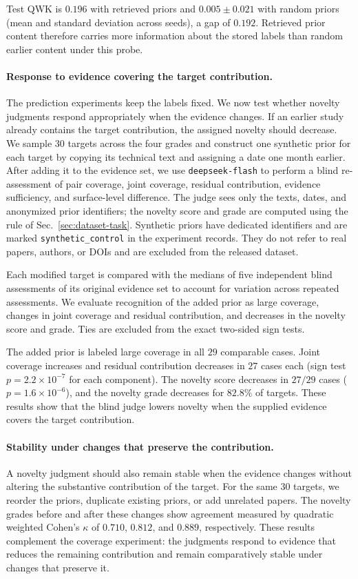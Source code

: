 Test QWK is $0.196$ with retrieved priors and $0.005\pm0.021$ with random
priors (mean and standard deviation across seeds), a gap of $0.192$.
Retrieved prior content therefore carries more information about the stored
labels than random earlier content under this probe.

\paragraph{Response to evidence covering the target contribution.}
The prediction experiments keep the labels fixed. We now test whether novelty
judgments respond appropriately when the evidence changes. If an earlier study
already contains the target contribution, the assigned novelty should decrease.
We sample $30$ targets across the four grades and construct one synthetic prior
for each target by copying its technical text and assigning a date one month
earlier. After adding it to the evidence set, we use \texttt{deepseek-flash}
to perform a blind re-assessment of pair coverage, joint coverage, residual
contribution, evidence sufficiency, and surface-level difference. The judge sees
only the texts, dates, and anonymized prior identifiers; the novelty score and
grade are computed using the rule of Sec.~\ref{sec:dataset-task}. Synthetic
priors have dedicated identifiers and are marked \texttt{synthetic\_control}
in the experiment records. They do not refer to real papers, authors, or DOIs
and are excluded from the released dataset.

Each modified target is compared with the medians of five independent blind
assessments of its original evidence set to account for variation across
repeated assessments. We evaluate recognition of the added prior as large
coverage, changes in joint coverage and residual contribution, and decreases
in the novelty score and grade. Ties are excluded from the exact two-sided
sign tests.

The added prior is labeled large coverage in all $29$ comparable cases.
Joint coverage increases and residual contribution decreases in $27$ cases
each (sign test $p=2.2\times10^{-7}$ for each component). The novelty score
decreases in $27/29$ cases ($p=1.6\times10^{-6}$), and the novelty grade
decreases for $82.8\%$ of targets. These results show that the blind judge
lowers novelty when the supplied evidence covers the target contribution.

\paragraph{Stability under changes that preserve the contribution.}
A novelty judgment should also remain stable when the evidence changes without
altering the substantive contribution of the target. For the same $30$ targets,
we reorder the priors, duplicate existing priors, or add unrelated papers.
The novelty grades before and after these changes show agreement measured by
quadratic weighted Cohen's $\kappa$ \citep{cohen1960kappa} of $0.710$, $0.812$,
and $0.889$, respectively. These results complement the coverage experiment:
the judgments respond to evidence that reduces the remaining contribution and
remain comparatively stable under changes that preserve it.
